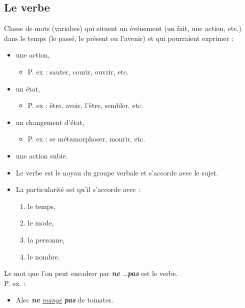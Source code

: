 \documentclass[10pt, french]{article}
\begin{document}
\begin{multicols*}{2}
\subsection{Le verbe}\label{sec:classes-verb}
\begin{definitionNOHFILL}[Le verbe]
Classe de mots (variabes) qui situent un événement (un fait, une action, etc.) dans le temps (le passé, le présent ou l'avenir) et qui pourraient exprimer : 
\begin{itemize}
	\item	une action,
		\begin{itemize}
		\item	P. ex : sauter, courir, ouvrir, etc.
		\end{itemize}
	\item	un état,
		\begin{itemize}
		\item	P. ex : être, avoir, l'être, sembler, etc.
		\end{itemize}
	\item	un changement d'état,
		\begin{itemize}
		\item	P. ex : se métamorphoser, mourir, etc.
		\end{itemize}
	\item	une action subie.
\end{itemize}

\begin{itemize}
	\item	Le verbe est le noyau du groupe verbale et s'accorde avec le sujet.
	\item	La particularité est qu'il s'accorde avec : 
		\begin{enumerate}
		\item	le temps,
		\item	le mode,
		\item	la personne,
		\item	le nombre.
		\end{enumerate}
\end{itemize}
\begin{astuces}
Le mot que l'on peut encadrer par \textit{\textbf{ne} \dots \textbf{pas}} est le verbe.\\

P. ex. : 
\begin{itemize}
	\item	Alec \textbf{\textit{ne}} \underline{\textit{mange}} \textbf{\textit{pas}} de tomates.
\end{itemize}
\end{astuces}
\end{definitionNOHFILL}


\end{multicols*}
\end{document}
